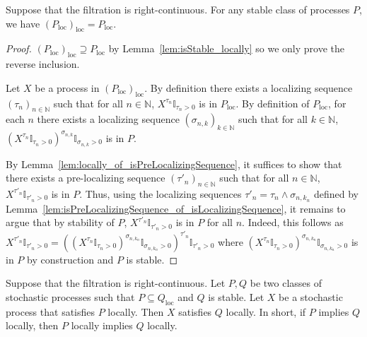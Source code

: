 \begin{lemma}\label{lem:locally_locally}
  \leanok
Suppose that the filtration is right-continuous.
For any stable class of processes $P$, we have $(P_{\mathrm{loc}})_{\mathrm{loc}} = P_{\mathrm{loc}}$.
\end{lemma}

\begin{proof}\leanok
$(P_{\mathrm{loc}})_{\mathrm{loc}} \supseteq P_{\mathrm{loc}}$ by Lemma~\ref{lem:isStable_locally} so we only prove the reverse inclusion.

Let $X$ be a process in $(P_{\mathrm{loc}})_{\mathrm{loc}}$.
By definition there exists a localizing sequence $(\tau_n)_{n \in \mathbb{N}}$ such that for all $n \in \mathbb{N}$, $X^{\tau_n}\mathbb{I}_{\tau_n > 0}$ is in $P_{\mathrm{loc}}$.
By definition of $P_{\mathrm{loc}}$, for each $n$ there exists a localizing sequence $(\sigma_{n,k})_{k \in \mathbb{N}}$ such that for all $k \in \mathbb{N}$, $(X^{\tau_n}\mathbb{I}_{\tau_n > 0})^{\sigma_{n,k}}\mathbb{I}_{\sigma_{n,k} > 0}$ is in $P$.

By Lemma~\ref{lem:locally_of_isPreLocalizingSequence}, it suffices to show that there exists a pre-localizing sequence $(\tau'_n)_{n \in \mathbb{N}}$ such that for all $n \in \mathbb{N}$, $X^{\tau'_n}\mathbb{I}_{\tau'_n > 0}$ is in $P$.
Thus, using the localizing sequences $\tau'_n = \tau_n \wedge \sigma_{n, k_n}$ defined by Lemma~\ref{lem:isPreLocalizingSequence_of_isLocalizingSequence},
it remains to argue that by stability of $P$, $X^{\tau'_n}\mathbb{I}_{\tau'_n > 0}$ is in $P$ for all $n$.
Indeed, this follows as $X^{\tau'_n}\mathbb{I}_{\tau'_n > 0} = ((X^{\tau_n}\mathbb{I}_{\tau_n > 0})^{\sigma_{n,k_n}}\mathbb{I}_{\sigma_{n,k_n} > 0})^{\tau'_n}\mathbb{I}_{\tau'_n > 0}$ where $(X^{\tau_n}\mathbb{I}_{\tau_n > 0})^{\sigma_{n,k_n}}\mathbb{I}_{\sigma_{n,k_n} > 0}$ is in $P$ by construction and $P$ is stable.
\end{proof}


\begin{lemma}\label{lem:local_induction}
  \leanok
Suppose that the filtration is right-continuous.
Let $P, Q$ be two classes of stochastic processes such that $P \subseteq Q_{\mathrm{loc}}$ and $Q$ is stable.
Let $X$ be a stochastic process that satisfies $P$ locally.
Then $X$ satisfies $Q$ locally.
In short, if $P$ implies $Q$ locally, then $P$ locally implies $Q$ locally.
\end{lemma}


